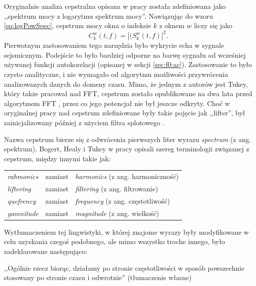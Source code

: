 \documentclass[12pt,a4paper,twoside]{mwart}
\begin{document}
Oryginalnie analiza cepstralna opisana w pracy \cite{Transcription:Bogert:FirstCepstrum} została zdefiniowana jako ,,spektrum mocy z logarytmu spektrum mocy''. Nawiązując do wzoru \ref{eq:logPowSpec}, cepstrum mocy okna o indeksie $k$ z oknem $w$ liczy się jako 
\begin{equation}\label{eq:ceps1}
  C_k^w(t, f) = |(S_k^w(t,f)|^2.
\end{equation}
Pierwotnym zastosowaniem tego narzędzia było wykrycie echa w sygnale sejsmicznym. Podejście to było bardziej odporne na barwę sygnału od wcześniej używanej funkcji autokorelacji (opisanej w sekcji \ref{sec:f0:ac}). Zastosowanie to było czysto analityczne, i nie wymagało od algorytmu możliwości przywrócenia analizowanych danych do domeny czasu. Mimo, że jednym z autorów \cite{Transcription:Bogert:FirstCepstrum} jest Tukey, który także pracował nad FFT, cepstrum zostało opublikowane na dwa lata przed algorytmem FFT \cite{Transcription:Tukey:FFT}, przez co jego potencjał nie był jeszcze odkryty. Choć w oryginalnej pracy nad cepstrum zdefiniowane były takie pojęcie jak ,,lifter'', był zainicjalizowany później z użyciem filtra splotowego \cite[1-2]{Transcription:Randall:CepstrumHistory}. 

Nazwa cepstrum bierze się z odwrócenia pierwszych liter wyrazu \textit{spectrum} (z ang. spektrum). Bogert, Healy i Tukey w pracy \cite{Transcription:Bogert:FirstCepstrum} opisali szereg terminologii związanej z cepstrum, między innymi takie jak:
\begin{table}[H]\centering
  \begin{tabular}{lll}
  \textit{rahmonics} & zamiast & \textit{harmonics} (z ang. harmoniczność) \\
  \textit{liftering} & zamiast & \textit{filtering} (z ang. filtrowanie) \\
  \textit{quefrency} & zamiast & \textit{frequency} (z ang. częstotliwość) \\
  \textit{gamnitude} & zamiast & \textit{magnitude} (z ang. wielkość)
  \end{tabular}
\end{table}
\noindent Wytłumaczeniem tej lingwistyki, w której znajome wyrazy były modyfikowane w celu uzyskania czegoś podobnego, ale mimo wszystko troche innego, było zadeklarowane następująco: 
\begin{displayquote}
,,Ogólnie rzecz biorąc, działamy po stronie częstotliwości w sposób powszechnie stosowany po stronie czasu i odwrotnie'' \cite[95]{Transcription:Oppenheim:FromFqToQf} (tłumaczenie własne)
\end{displayquote}
\end{document}

